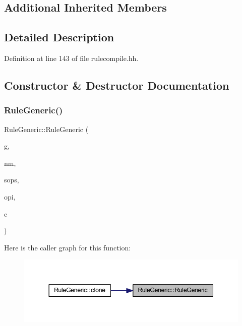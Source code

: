 \subsection*{Additional Inherited Members}


\subsection{Detailed Description}


Definition at line 143 of file rulecompile.\+hh.



\subsection{Constructor \& Destructor Documentation}
\mbox{\label{class_rule_generic_a60ed32c688c4a4c42a0a57ed779fc296}} 
\subsubsection{\texorpdfstring{RuleGeneric()}{RuleGeneric()}}
{\footnotesize\ttfamily Rule\+Generic\+::\+Rule\+Generic (\begin{DoxyParamCaption}\item[{const string \&}]{g,  }\item[{const string \&}]{nm,  }\item[{const vector$<$ \mbox{\hyperlink{opcodes_8hh_abeb7dfb0e9e2b3114e240a405d046ea7}{Op\+Code}} $>$ \&}]{sops,  }\item[{int4}]{opi,  }\item[{\mbox{\hyperlink{class_constraint_group}{Constraint\+Group}} $\ast$}]{c }\end{DoxyParamCaption})}

Here is the caller graph for this function\+:
\nopagebreak
\begin{figure}[H]
\begin{center}
\leavevmode
\includegraphics[width=344pt]{class_rule_generic_a60ed32c688c4a4c42a0a57ed779fc296_icgraph}
\end{center}
\end{figure}
\mbox{\label{class_rule_generic_ae805742f3a547956f54e80b4e0be4d51}} 
